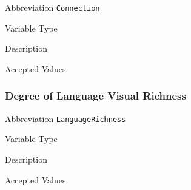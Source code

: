 \begin{AlignedDesc}
  \item[Abbreviation] \texttt{Connection}

  \item[Variable Type]

  \item[Description]

  \item[Accepted Values]

  \begin{AlignedDesc}
    \item[\textellipsis]
  \end{AlignedDesc}

\end{AlignedDesc}

\subsubsection{Degree of Language Visual Richness}
\label{subsec:languagerichness}

\begin{AlignedDesc}
  \item[Abbreviation] \texttt{LanguageRichness}

  \item[Variable Type]

  \item[Description]

  \item[Accepted Values]

  \begin{AlignedDesc}
    \item[\textellipsis]
  \end{AlignedDesc}

\end{AlignedDesc}



